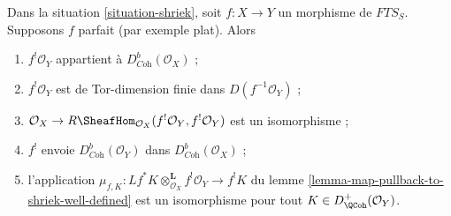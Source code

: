 \begin{lemma}
\label{lemma-perfect-comparison-shriek}
Dans la situation \ref{situation-shriek}, soit $f : X \to Y$ un morphisme de $\textit{FTS}_S$. Supposons $f$ parfait (par exemple plat). Alors
\begin{enumerate}
\item[(a)] $f^!\mathcal{O}_Y$ appartient à $D_{\textit{Coh}}^b(\mathcal{O}_X)$ ;
\item[(b)] $f^!\mathcal{O}_Y$ est de Tor-dimension finie dans $D(f^{-1}\mathcal{O}_Y)$ ;
\item[(c)] $\mathcal{O}_X \to
R\SheafHom_{\mathcal{O}_X}(f^!\mathcal{O}_Y, f^!\mathcal{O}_Y)$ est un isomorphisme ;
\item[(d)] $f^!$ envoie $D_{\textit{Coh}}^b(\mathcal{O}_Y)$ dans $D_{\textit{Coh}}^b(\mathcal{O}_X)$ ;
\item[(e)] l'application
$\mu_{f,  K} :
Lf^*K \otimes_{\mathcal{O}_X}^\mathbf{L} f^!\mathcal{O}_Y
\to
f^!K$
du lemme \ref{lemma-map-pullback-to-shriek-well-defined} est un isomorphisme pour tout $K \in D_\QCoh^+(\mathcal{O}_Y)$.
\end{enumerate}
\end{lemma}


